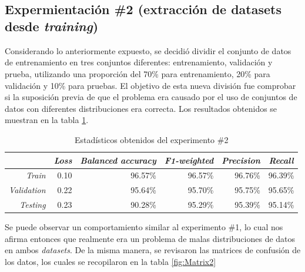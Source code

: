 \\\\
\subsection{Expermientación \#2 (extracción de datasets desde \textit{training}) }
Considerando lo anteriormente expuesto, se decidió dividir el conjunto de datos de entrenamiento en tres conjuntos diferentes: entrenamiento, validación y prueba, utilizando una proporción del 70\% para entrenamiento, 20\% para validación y 10\% para pruebas. El objetivo de esta nueva división fue comprobar si la suposición previa de que el problema era causado por el uso de conjuntos de datos con diferentes distribuciones era correcta. Los resultados obtenidos se muestran en la tabla \ref{table:Results4}.
\\
\begin{table}[h!]
\footnotesize
\centering
\begin{tabular}{|r|r|r|r|r|r|}
\hline
           & \multicolumn{1}{c|}{\textit{Loss}} & \multicolumn{1}{c|}{\textit{Balanced accuracy}} & \multicolumn{1}{c|}{\textit{F1-weighted}} & \multicolumn{1}{c|}{\textit{Precision}} & \multicolumn{1}{c|}{\textit{Recall}} \\ \hline
\textit{Train}      & 0.10                      & 96.57\%                        & 96.57\%                 & 96.76\%                         & 96.39\%                     \\ \hline
\textit{Validation} & 0.22                      & 95.64\%                        & 95.70\%                 & 95.75\%                         & 95.65\%                     \\ \hline
\textit{Testing}    & 0.23                      & 90.28\%                       & 95.29\%                & 95.39\%                       & 95.14\%                    \\ \hline
\end{tabular}
\caption{Estadísticos obtenidos del experimento \#2}
\label{table:Results4}
\end{table}

Se puede observar un comportamiento similar al experimento \#1, lo cual nos afirma entonces que realmente era un problema de malas distribuciones de datos en ambos \textit{datasets}. De la misma manera, se revisaron las matrices de confusión de los datos, los cuales se recopilaron en la tabla \ref{fig:Matrix2}

